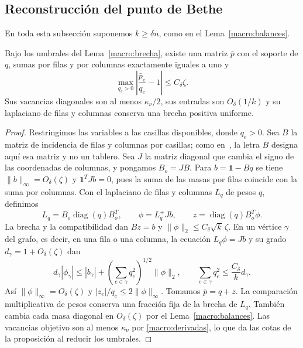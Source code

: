 \subsection{Reconstrucción del punto de Bethe}\label{macro:reconstruccion}
En toda esta subsección suponemos $k\ge\delta n$, como en el Lema~\ref{macro:balances}.

\begin{proposicion}\label{macro:reequilibrado}
Bajo los umbrales del Lema~\ref{macro:brecha}, existe una matriz $\bar p$ con el soporte de $q$,
sumas por filas y por columnas exactamente iguales a uno y
\[
 \max_{q_e>0}\left|\frac{\bar p_e}{q_e}-1\right|\le C_\delta\zeta .
\]
Sus vacancias diagonales son al menos $\kappa_\nu/2$, sus entradas son $O_\delta(1/k)$ y su laplaciano
de filas y columnas conserva una brecha positiva uniforme.
\end{proposicion}
\begin{proof}
Restringimos las variables a las casillas disponibles, donde $q_e>0$. Sea $B$ la matriz de incidencia
de filas y columnas por casillas; como en~\cite[Sección~6.1]{pred}, la letra $B$ designa aquí esa
matriz y no un tablero. Sea $J$ la matriz diagonal que cambia el signo de las coordenadas de
columnas, y pongamos $B_o=JB$. Para $b=\mathbf1-Bq$ se tiene $\|b\|_\infty=O_\delta(\zeta)$ y
$\mathbf1^TJb=0$, pues la suma de las masas por filas coincide con la suma por columnas. Con el
laplaciano de filas y columnas $L_q$ de pesos $q$, definimos
\[
 L_q=B_o\operatorname{diag}(q)B_o^T,\qquad
 \phi=L_q^+Jb,\qquad z=\operatorname{diag}(q)B_o^T\phi .
\]
La brecha y la compatibilidad dan $Bz=b$ y $\|\phi\|_2\le C_\delta\sqrt{k}\,\zeta$. En un vértice
$\gamma$ del grafo, es decir, en una fila o una columna, la ecuación $L_q\phi=Jb$ y su grado
$d_\gamma=1+O_\delta(\zeta)$ dan
\[
 d_\gamma|\phi_\gamma|\le |b_\gamma|+
 \left(\sum_{e\in\gamma}q_e^2\right)^{1/2}\|\phi\|_2,
 \qquad \sum_{e\in\gamma}q_e^2\le \frac{C_\delta}{k}d_\gamma .
\]
Así $\|\phi\|_\infty=O_\delta(\zeta)$ y $|z_e|/q_e\le2\|\phi\|_\infty$. Tomamos $\bar p=q+z$. La
comparación multiplicativa de pesos conserva una fracción fija de la brecha de $L_q$. También cambia
cada masa diagonal en $O_\delta(\zeta)$ por el Lema~\ref{macro:balances}. Las vacancias objetivo son
al menos $\kappa_\nu$ por \eqref{macro:derivadas}, lo que da las cotas de la proposición al reducir
los umbrales.
\end{proof}

